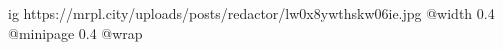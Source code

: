  
 
 
 
 

\ifcmt
  ig https://mrpl.city/uploads/posts/redactor/lw0x8ywthskw06ie.jpg
  @width 0.4
  @minipage 0.4
  @wrap \parpic[r]
\fi
